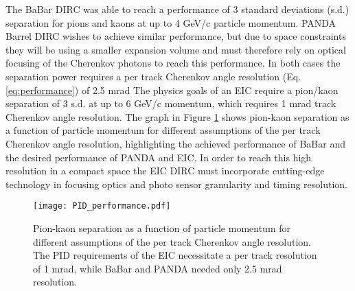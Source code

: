 \label{ch:eicdirc}
The BaBar DIRC was able to reach a performance of 3 standard deviations (s.d.) separation for pions and kaons at up to 4 GeV/c particle momentum. PANDA Barrel DIRC wishes to achieve similar performance, but due to space constraints they will be using a smaller expansion volume and must therefore rely on optical focusing of the Cherenkov photons to reach this performance. In both cases the separation power requires a per track Cherenkov angle resolution (Eq. \ref{eq:performance}) of 2.5 mrad The physics goals of an EIC require a pion/kaon separation of 3 s.d. at up to 6 GeV/c momentum, which requires 1 mrad track Cherenkov angle resolution. The graph in Figure \ref{fig:PID_performance} shows pion-kaon separation as a function of particle momentum for different assumptions of the per track Cherenkov angle resolution, highlighting the achieved performance of BaBar and the desired performance of PANDA and EIC. In order to reach this high resolution in a compact space the EIC DIRC must incorporate cutting-edge technology in focusing optics and photo sensor granularity and timing resolution.

\begin{figure}[!htb]
	\centering
	\texttt{[image: PID\_performance.pdf]}
	\caption{Pion-kaon separation as a function of particle momentum for different assumptions of the per track Cherenkov angle resolution. The PID requirements of the EIC necessitate a per track resolution of 1 mrad, while BaBar and PANDA needed only 2.5 mrad resolution.}
	\label{fig:PID_performance}
\end{figure}

